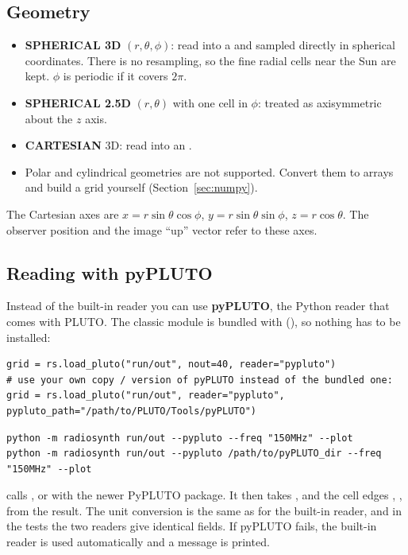 \subsection*{Geometry}
\begin{itemize}[itemsep=1pt]
\item \textbf{SPHERICAL 3D} $(r,\theta,\phi)$: read into a  and
      sampled directly in spherical coordinates. There is no resampling, so the fine
      radial cells near the Sun are kept. $\phi$ is periodic if it covers $2\pi$.
\item \textbf{SPHERICAL 2.5D} $(r,\theta)$ with one cell in $\phi$: treated as
      axisymmetric about the $z$ axis.
\item \textbf{CARTESIAN} 3D: read into an .
\item Polar and cylindrical geometries are not supported. Convert them to arrays and
      build a grid yourself (Section~\ref{sec:numpy}).
\end{itemize}
The Cartesian axes are $x=r\sin\theta\cos\phi$, $y=r\sin\theta\sin\phi$,
$z=r\cos\theta$. The observer position and the image ``up'' vector refer to these axes.

\subsection*{Reading with pyPLUTO}
Instead of the built-in reader you can use \textbf{pyPLUTO}, the Python reader that comes
with PLUTO. The classic  module is bundled with 
(), so nothing has to be installed:
\begin{lstlisting}[style=pyex]
grid = rs.load_pluto("run/out", nout=40, reader="pypluto")
# use your own copy / version of pyPLUTO instead of the bundled one:
grid = rs.load_pluto("run/out", reader="pypluto", pypluto_path="/path/to/PLUTO/Tools/pyPLUTO")
\end{lstlisting}
\begin{lstlisting}
python -m radiosynth run/out --pypluto --freq "150MHz" --plot
python -m radiosynth run/out --pypluto /path/to/pyPLUTO_dir --freq "150MHz" --plot
\end{lstlisting}
 calls , or
 with the newer PyPLUTO package. It then takes
,  and the cell edges , ,  from the
result. The unit conversion is the same as for the built-in reader, and in the tests
the two readers give identical fields. If pyPLUTO fails, the built-in reader is used
automatically and a message is printed.

